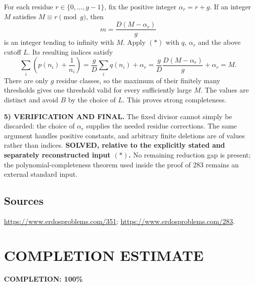 For each residue $r\in\{0,\ldots,g-1\}$, fix the positive integer $\alpha_r=r+g$. If an integer $M$ satisfies $M\equiv r\pmod g$, then
\[
 m=\frac{D(M-\alpha_r)}g
\]
is an integer tending to infinity with $M$. Apply $(*)$ with $q$, $\alpha_r$ and the above cutoff $L$. Its resulting indices satisfy
\[
 \sum_i\left(p(n_i)+\frac1{n_i}\right)
 =\frac gD\sum_iq(n_i)+\alpha_r
 =\frac gD\frac{D(M-\alpha_r)}g+\alpha_r=M.
\]
There are only $g$ residue classes, so the maximum of their finitely many thresholds gives one threshold valid for every sufficiently large $M$. The values are distinct and avoid $B$ by the choice of $L$. This proves strong completeness.

\noindent\textbf{5) VERIFICATION AND FINAL.}
The fixed divisor cannot simply be discarded: the choice of $\alpha_r$ supplies the needed residue corrections. The same argument handles positive constants, and arbitrary finite deletions are of values rather than indices. \textbf{SOLVED, relative to the explicitly stated and separately reconstructed input $(*)$.} No remaining reduction gap is present; the polynomial-completeness theorem used inside the proof of 283 remains an external standard input.

\subsection*{Sources}
\url{https://www.erdosproblems.com/351}; \url{https://www.erdosproblems.com/283}.

\section{COMPLETION ESTIMATE}
\textbf{COMPLETION: 100\%}
